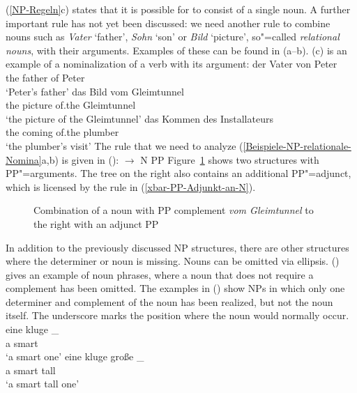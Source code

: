 \addlines
(\ref{NP-Regeln}c) states that it is possible for \nbar to consist of a single noun. A further important rule has not yet been
discussed: we need another rule to combine nouns such as \emph{Vater} `father', \emph{Sohn} `son' or \emph{Bild} `picture', 
so"=called \emph{relational nouns}, with their arguments. Examples of these can be found in (a--b).
(c) is an example of a nominalization of a verb with its argument:
\eal
\label{Beispiele-NP-relationale-Nomina}
\ex 
\gll der Vater von Peter\\
	 the father of Peter\\
\glt `Peter's father'
\ex 
\gll das Bild vom Gleimtunnel\\
	 the picture of.the Gleimtunnel\\
\glt `the picture of the Gleimtunnel'
\ex 
\gll das Kommen des Installateurs\\
	 the coming of.the plumber\\
\glt `the plumber's visit'
\zl
\noindent
The rule that we need to analyze (\ref{Beispiele-NP-relationale-Nomina}a,b) is given in
():
\ea
\nbar $\to$ N PP
\z
%
Figure~\ref{Abbildung-NP-mit-PP-Argument} shows two structures with PP"=arguments. The tree on the right also contains an additional PP"=adjunct, which is licensed
by the rule in (\ref{xbar-PP-Adjunkt-an-N}).
\begin{figure}
\caption{\label{Abbildung-NP-mit-PP-Argument}Combination of a noun with PP complement
  \emph{vom Gleimtunnel} to the right with an adjunct PP}
\end{figure}%


In addition to the previously discussed NP structures, there are other structures where the determiner or noun is missing.
Nouns can be omitted via ellipsis. () gives an example of noun phrases, where a noun that does not require a complement
has been omitted. The examples in () show NPs in which only one determiner and complement of the noun has been realized,
but not the noun itself. The underscore marks the position where the noun would normally occur. 
\eal
\label{ex-nounless-np}
\ex 
\gll eine kluge \_\\
	 a smart\\
\glt `a smart one'
\ex 
\gll eine kluge große \_\\
     a    smart tall\\
\glt `a smart tall one'

